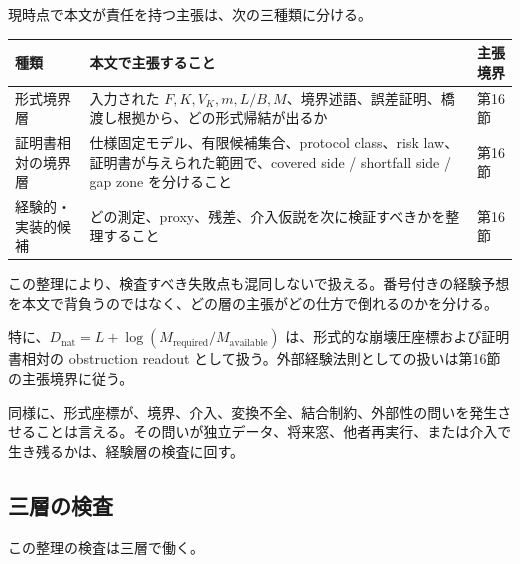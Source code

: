 \documentclass[12pt,a4paper]{article}
\begin{document}
現時点で本文が責任を持つ主張は、次の三種類に分ける。

{\def\LTcaptype{table} %
\begin{longtable}[]{@{}
  >{\raggedright\arraybackslash}p{}
  >{\raggedright\arraybackslash}p{}
  >{\raggedright\arraybackslash}p{}@{}}
\toprule\noalign{}
\begin{minipage}[b]{\linewidth}\raggedright
種類
\end{minipage} & \begin{minipage}[b]{\linewidth}\raggedright
本文で主張すること
\end{minipage} & \begin{minipage}[b]{\linewidth}\raggedright
主張境界
\end{minipage} \\
\midrule\noalign{}
\endhead
\bottomrule\noalign{}
\endlastfoot
形式境界層 & 入力された \(F,K,V_K,m,L/B,M\)、境界述語、誤差証明、橋渡し根拠から、どの形式帰結が出るか & 第16節 \\
証明書相対の境界層 & 仕様固定モデル、有限候補集合、protocol class、risk law、証明書が与えられた範囲で、covered side / shortfall side / gap zone を分けること & 第16節 \\
経験的・実装的候補 & どの測定、proxy、残差、介入仮説を次に検証すべきかを整理すること & 第16節 \\
\end{longtable}
}

この整理により、検査すべき失敗点も混同しないで扱える。番号付きの経験予想を本文で背負うのではなく、どの層の主張がどの仕方で倒れるのかを分ける。

特に、\(D_{\mathrm{nat}}=L+\log(M_{\mathrm{required}}/M_{\mathrm{available}})\) は、形式的な崩壊圧座標および証明書相対の obstruction readout として扱う。外部経験法則としての扱いは第16節の主張境界に従う。

同様に、形式座標が、境界、介入、変換不全、結合制約、外部性の問いを発生させることは言える。その問いが独立データ、将来窓、他者再実行、または介入で生き残るかは、経験層の検査に回す。

\subsection{三層の検査}\label{ux4e09ux5c64ux306eux691cux67fb}

この整理の検査は三層で働く。
\end{document}
